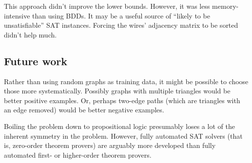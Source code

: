 \documentclass[12pt]{article}
\begin{document}
This approach didn't improve the lower bounds. However, it was
less memory-intensive than using BDDs. It may be a useful source
of ``likely to be unsatisfiable'' SAT instances.
Forcing the wires' adjacency matrix to be sorted didn't help much.

\subsection{Future work}

Rather than using random graphs as training data, it might be possible to choose those
more systematically. Possibly graphs with multiple triangles would be 
better positive examples.
Or, perhaps two-edge paths (which are triangles with an edge removed) would be better negative
examples.

Boiling the problem down to propositional logic presumably loses a lot of the inherent
symmetry in the problem. However, fully automated SAT solvers (that is, zero-order
theorem provers) are arguably more developed
than fully automated first- or higher-order theorem provers.



\end{document}
